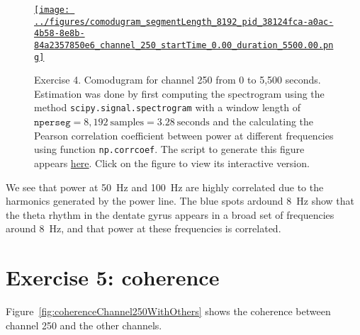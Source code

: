 \documentclass[12pt]{article}
\begin{document}
\begin{figure}[H]
    \begin{center}
        \href{https://www.gatsby.ucl.ac.uk/~rapela/neuroinformatics/2023/ws3/figures/comodugram_segmentLength_8192_pid_38124fca-a0ac-4b58-8e8b-84a2357850e6_channel_250_startTime_0.00_duration_5500.00.html}{\texttt{[image: ../figures/comodugram\_segmentLength\_8192\_pid\_38124fca-a0ac-4b58-8e8b-84a2357850e6\_channel\_250\_startTime\_0.00\_duration\_5500.00.png]}}



        \caption{Exercise 4. Comodugram for channel 250 from 0 to 5,500
        seconds. Estimation was done by first computing the spectrogram
        using the method \texttt{scipy.signal.spectrogram} with a window length
        of $\mathtt{nperseg}=8,192\ \text{samples}=3.28\ \text{seconds}$ and the
        calculating the Pearson correlation coefficient between power at different
        frequencies using function \texttt{np.corrcoef}.
        The script to generate this figure appears
        \href{https://github.com/joacorapela/neuroinformatics23/blob/master/worksheets/ws3/mySolution/code/scripts/doPlotComodugram.py}{here}.
        Click on the figure to view its interactive version.  }

                \label{fig:comodugramChannel250}

            \end{center}
        \end{figure}

We see that power at 50~Hz and 100~Hz are highly correlated due to the
harmonics generated by the power line. The blue spots ardound 8~Hz show that
the theta rhythm in the dentate gyrus appears in a broad set of frequencies
around 8~Hz, and that power at these frequencies is correlated.

\section*{Exercise 5: coherence}

Figure~\ref{fig:coherenceChannel250WithOthers} shows the coherence between
channel 250 and the other channels.
\end{document}

